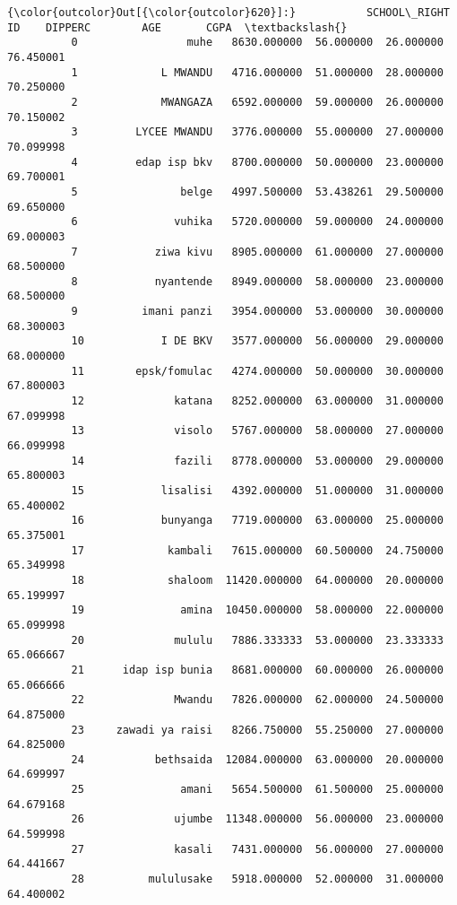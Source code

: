 \documentclass[11pt]{article}
\begin{document}
            \begin{Verbatim}[commandchars=\\\{\}]
{\color{outcolor}Out[{\color{outcolor}620}]:}           SCHOOL\_RIGHT            ID    DIPPERC        AGE       CGPA  \textbackslash{}
          0                 muhe   8630.000000  56.000000  26.000000  76.450001   
          1             L MWANDU   4716.000000  51.000000  28.000000  70.250000   
          2             MWANGAZA   6592.000000  59.000000  26.000000  70.150002   
          3         LYCEE MWANDU   3776.000000  55.000000  27.000000  70.099998   
          4         edap isp bkv   8700.000000  50.000000  23.000000  69.700001   
          5                belge   4997.500000  53.438261  29.500000  69.650000   
          6               vuhika   5720.000000  59.000000  24.000000  69.000003   
          7            ziwa kivu   8905.000000  61.000000  27.000000  68.500000   
          8            nyantende   8949.000000  58.000000  23.000000  68.500000   
          9          imani panzi   3954.000000  53.000000  30.000000  68.300003   
          10            I DE BKV   3577.000000  56.000000  29.000000  68.000000   
          11        epsk/fomulac   4274.000000  50.000000  30.000000  67.800003   
          12              katana   8252.000000  63.000000  31.000000  67.099998   
          13              visolo   5767.000000  58.000000  27.000000  66.099998   
          14              fazili   8778.000000  53.000000  29.000000  65.800003   
          15            lisalisi   4392.000000  51.000000  31.000000  65.400002   
          16            bunyanga   7719.000000  63.000000  25.000000  65.375001   
          17             kambali   7615.000000  60.500000  24.750000  65.349998   
          18             shaloom  11420.000000  64.000000  20.000000  65.199997   
          19               amina  10450.000000  58.000000  22.000000  65.099998   
          20              mululu   7886.333333  53.000000  23.333333  65.066667   
          21      idap isp bunia   8681.000000  60.000000  26.000000  65.066666   
          22              Mwandu   7826.000000  62.000000  24.500000  64.875000   
          23     zawadi ya raisi   8266.750000  55.250000  27.000000  64.825000   
          24           bethsaida  12084.000000  63.000000  20.000000  64.699997   
          25               amani   5654.500000  61.500000  25.000000  64.679168   
          26              ujumbe  11348.000000  56.000000  23.000000  64.599998   
          27              kasali   7431.000000  56.000000  27.000000  64.441667   
          28          mululusake   5918.000000  52.000000  31.000000  64.400002   

\end{Verbatim}
\end{document}

